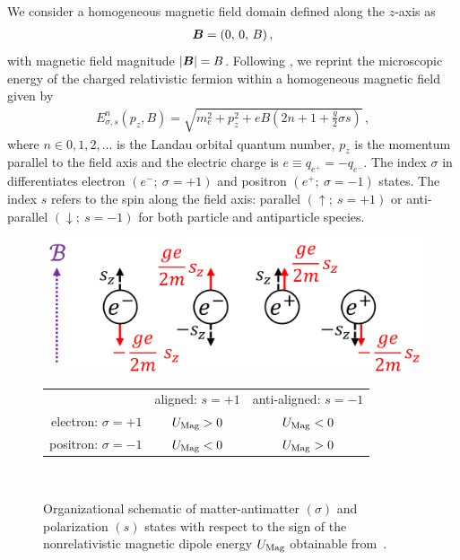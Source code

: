 We consider a homogeneous magnetic field domain defined along the $z$-axis as
\begin{gather}
 \label{homoB:1}
 \boldsymbol{B}=(0,\,0,\,B)\,,
\end{gather}
with magnetic field magnitude $|\boldsymbol{B}|=B$. Following \cite{Steinmetz:2018ryf}, we reprint the microscopic energy of the charged relativistic fermion within a homogeneous magnetic field given by
\begin{align}
 \label{cosmokgp}
 E^{n}_{\sigma,s}(p_{z},{B})=\sqrt{m_{e}^{2}+p_{z}^{2}+e{B}\left(2n+1+\frac{g}{2}\sigma s\right)}\,,
\end{align}
where $n\in0,1,2,\ldots$ is the Landau orbital quantum number, $p_{z}$ is the momentum parallel to the field axis and the electric charge is $e\equiv q_{e^{+}}=-q_{e^{-}}$. The index $\sigma$ in  differentiates electron $(e^{-};\ \sigma=+1)$ and positron $(e^{+};\ \sigma=-1)$ states. The index $s$ refers to the spin along the field axis: parallel $(\uparrow;\ s=+1)$ or anti-parallel $(\downarrow;\ s=-1)$ for both particle and antiparticle species.

\begin{figure}
 \centering
 \includegraphics[width=0.8\linewidth]{plots/schematic.png}\Bstrut\\
 \begin{tabular}{ r|c|c| }
 \multicolumn{1}{r}{}
 & \multicolumn{1}{c}{aligned: $s=+1$}
 & \multicolumn{1}{c}{anti-aligned: $s=-1$} \\
 \cline{2-3}
 electron: $\sigma=+1$ & $U_{\rm Mag}>0$ & $U_{\rm Mag}<0$ \TBstrut\\
 \cline{2-3}
 positron: $\sigma=-1$ & $U_{\rm Mag}<0$ & $U_{\rm Mag}>0$ \TBstrut\\
 \cline{2-3}
 \end{tabular}\\
 \caption{Organizational schematic of matter-antimatter $(\sigma)$ and polarization $(s)$ states with respect to the sign of the nonrelativistic magnetic dipole energy $U_{\rm Mag}$ obtainable from~. }
 \label{fig:schematic}
\end{figure}

